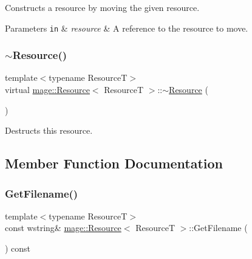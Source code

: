 Constructs a resource by moving the given resource.


\begin{DoxyParams}[1]{Parameters}
\mbox{\tt in}  & {\em resource} & A reference to the resource to move. \\
\hline
\end{DoxyParams}
\hypertarget{classmage_1_1_resource_a56a3ac799224e100b271b65ec455b59e}{}\label{classmage_1_1_resource_a56a3ac799224e100b271b65ec455b59e} 
\subsubsection{\texorpdfstring{$\sim$\+Resource()}{~Resource()}}
{\footnotesize\ttfamily template$<$typename ResourceT$>$ \\
virtual \hyperlink{classmage_1_1_resource}{mage\+::\+Resource}$<$ ResourceT $>$\+::$\sim$\hyperlink{classmage_1_1_resource}{Resource} (\begin{DoxyParamCaption}{ }\end{DoxyParamCaption})\hspace{0.3cm}{\ttfamily [virtual]}}

Destructs this resource. 

\subsection{Member Function Documentation}
\hypertarget{classmage_1_1_resource_a21bed60ba52a741eaffddc953f241be7}{}\label{classmage_1_1_resource_a21bed60ba52a741eaffddc953f241be7} 
\subsubsection{\texorpdfstring{Get\+Filename()}{GetFilename()}}
{\footnotesize\ttfamily template$<$typename ResourceT$>$ \\
const wstring\& \hyperlink{classmage_1_1_resource}{mage\+::\+Resource}$<$ ResourceT $>$\+::Get\+Filename (\begin{DoxyParamCaption}{ }\end{DoxyParamCaption}) const\hspace{0.3cm}{\ttfamily [noexcept]}}

